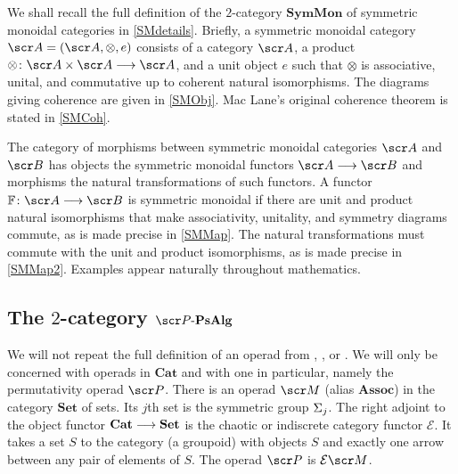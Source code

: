 \documentclass{amsart}
\theoremstyle{definition}
\numberwithin{equation}{section}
\newcommand{\PPs}{\sP\text{-}\mathbf{PsAlg}}
\newcommand{\SM}{\mathbf{SymMon}}
\begin{document}
We shall recall the full definition of the $2$-category $\SM$ of symmetric monoidal categories in \autoref{SMdetails}.  Briefly, a symmetric monoidal category $\sA = (\sA,\otimes, e)$ consists of a category $\sA$, a  product $\otimes\colon \sA\times \sA \rtarr \sA$, and a unit object $e$ such that $\otimes$ is associative, unital, and commutative up to coherent natural isomorphisms.  The diagrams  giving coherence are given in \autoref{SMObj}.  Mac Lane's original coherence theorem is stated in \autoref{SMCoh}.  
                                                                                                                                                                                                                                                                                                                                                                                                                                                                           
The category of morphisms between symmetric monoidal categories $\sA$ and $\sB$  has objects the symmetric monoidal functors $\sA \rtarr \sB$  and morphisms the natural transformations of such functors.   A functor $\bF\colon \sA \rtarr \sB$ is symmetric monoidal if there are unit and product natural isomorphisms that make associativity, unitality, and symmetry diagrams commute, as is made precise in \autoref{SMMap}.  The natural transformations must commute with the unit and product isomorphisms, as is made precise in \autoref{SMMap2}.    Examples appear naturally throughout mathematics.

\subsection{The $2$-category $\PPs$}\label{PPs}
We will not repeat the full definition of an operad from \cite{MayGeo}, \cite{MayOp1}, \cite{GMMO1} or \cite{LRZZ2}.  We will only be concerned with operads in $\mathbf{Cat}$ and with one in particular, namely the permutativity operad $\sP$. There is an operad $\sM$  (alias $\mathbf{Assoc}$) in the category $\mathbf{Set}$ of sets. Its  $j$th set is the symmetric group $\Sigma_j$.  The right adjoint  to the object functor $\mathbf{Cat} \longrightarrow \mathbf{Set}$ is the chaotic or indiscrete category functor $\mathcal{E}$.  It takes a set $S$ to the category (a groupoid) with objects $S$ and  exactly one arrow between any pair of elements of $S$.  The operad $\sP$ is $\mathcal{E}\sM$. %
\end{document}
